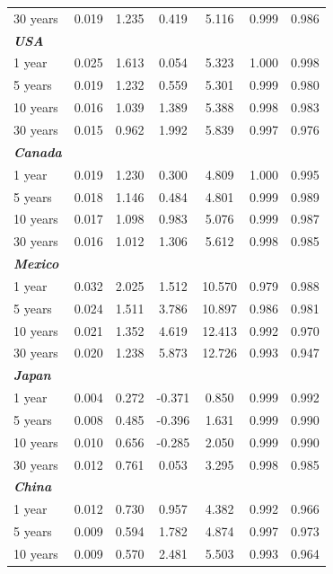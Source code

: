 \documentclass[12pt,bibliography=totoc]{article}
\begin{document}
{\begin{appendices}
\begin{table}[H]
\begin{tabular}{l c c c c c c}
30 years	&	0.019	&	1.235	&	0.419	&	5.116	&	0.999	&	0.986	\\
\textbf{\textit{USA}}	&		&		&		&		&		&		\\
1 year	&	0.025	&	1.613	&	0.054	&	5.323	&	1.000	&	0.998	\\
5 years	&	0.019	&	1.232	&	0.559	&	5.301	&	0.999	&	0.980	\\
10 years	&	0.016	&	1.039	&	1.389	&	5.388	&	0.998	&	0.983	\\

30 years	&	0.015	&	0.962	&	1.992	&	5.839	&	0.997	&	0.976	\\
\textbf{\textit{Canada}}	&		&		&		&		&		&		\\
1 year	&	0.019	&	1.230	&	0.300	&	4.809	&	1.000	&	0.995	\\
5 years	&	0.018	&	1.146	&	0.484	&	4.801	&	0.999	&	0.989	\\
10 years	&	0.017	&	1.098	&	0.983	&	5.076	&	0.999	&	0.987	\\
												
30 years	&	0.016	&	1.012	&	1.306	&	5.612	&	0.998	&	0.985	\\
\textbf{\textit{Mexico}}	&		&		&		&		&		&		\\
1 year	&	0.032	&	2.025	&	1.512	&	10.570	&	0.979	&	0.988	\\
5 years	&	0.024	&	1.511	&	3.786	&	10.897	&	0.986	&	0.981	\\
10 years	&	0.021	&	1.352	&	4.619	&	12.413	&	0.992	&	0.970	\\

30 years	&	0.020	&	1.238	&	5.873	&	12.726	&	0.993	&	0.947	\\
\textbf{\textit{Japan}}	&		&		&		&		&		&		\\
1 year	&	0.004	&	0.272	&	-0.371	&	0.850	&	0.999	&	0.992	\\
5 years	&	0.008	&	0.485	&	-0.396	&	1.631	&	0.999	&	0.990	\\
10 years	&	0.010	&	0.656	&	-0.285	&	2.050	&	0.999	&	0.990	\\
												
30 years	&	0.012	&	0.761	&	0.053 	&	3.295	&	0.998	&	0.985	\\
\textbf{\textit{China}}	&		&		&		&		&		&		\\
1 year	&	0.012	&	0.730	&	0.957	&	4.382	&	0.992	&	0.966	\\
5 years	&	0.009	&	0.594	&	1.782	&	4.874	&	0.997	&	0.973	\\
10 years	&	0.009	&	0.570	&	2.481	&	5.503	&	0.993	&	0.964	\\
												

\end{tabular}
\end{table}
\end{appendices}}
\end{document}

